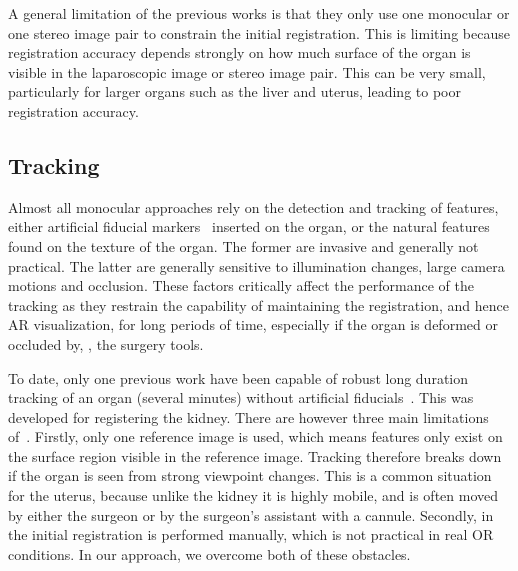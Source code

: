A general limitation of the previous works is that they only use one monocular or one stereo image pair to constrain the initial registration.
This is limiting because registration accuracy depends strongly on how much surface of the organ is visible in the laparoscopic image or stereo image pair. 
This can be very small, particularly for larger organs such as the liver and uterus, leading to poor registration accuracy. 



\subsection{Tracking}
\label{sec:sotaTracking}
Almost all monocular approaches rely on the detection and tracking of features, either artificial fiducial markers~\cite{Cohen2010Prostate} inserted on the organ, or the natural features found on the texture of the organ. The former are invasive and generally not practical. The latter are generally sensitive to illumination changes, large camera motions and occlusion. These factors critically affect the performance of the tracking as they restrain the capability of maintaining the registration, and hence AR visualization, for long periods of time, especially if the organ is deformed or occluded by, \eg, the surgery tools. 

To date, only one previous work have been capable of robust long duration tracking of an organ (several minutes) without artificial fiducials~\cite{affineTracking}. 
This was developed for registering the kidney. %
There are however three main limitations of~\cite{affineTracking}. 
Firstly, only one reference image is used, which means features only exist on the surface region visible in the reference image. 
Tracking therefore breaks down if the organ is seen from strong viewpoint changes. This is a common situation for the uterus, because unlike the kidney it is highly mobile, and is often moved by either the surgeon or by the surgeon's assistant with a cannule. 
Secondly, in ~\cite{affineTracking} the initial registration is performed manually, which is not practical in real OR conditions. 
In our approach, we overcome both of these obstacles. 

